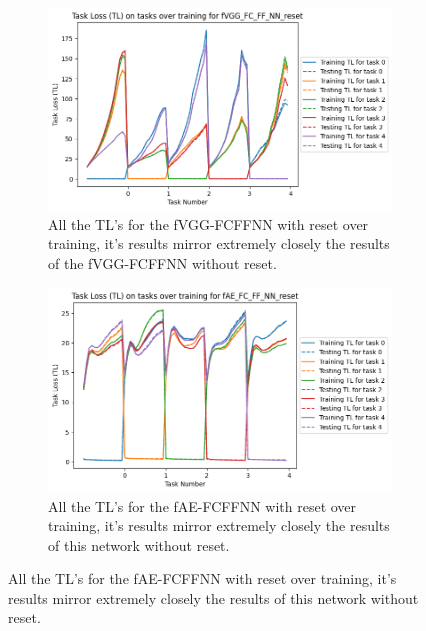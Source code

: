 \begin{appendices}
\begin{figure}[ht]
    \centering
    \begin{subfigure}[t]{0.4\textwidth}
       \includegraphics[width=\linewidth]{images/CIFAR10_CL/fVGG_FC_FF_NN_reset_TL_task.png}
       \caption{All the TL's for the fVGG-FCFFNN with reset over training, it's results mirror extremely closely the results of the fVGG-FCFFNN without reset.}
    \end{subfigure}
    \quad
    \begin{subfigure}[t]{0.4\textwidth}
       \includegraphics[width=\linewidth]{images/CIFAR10_CL/fAE_FC_FF_NN_reset_TL_task.png}
       \caption{All the TL's for the fAE-FCFFNN with reset over training, it's results mirror extremely closely the results of this network without reset.}
    \end{subfigure}
    
    \medskip %
  

\end{figure}
\end{appendices}

